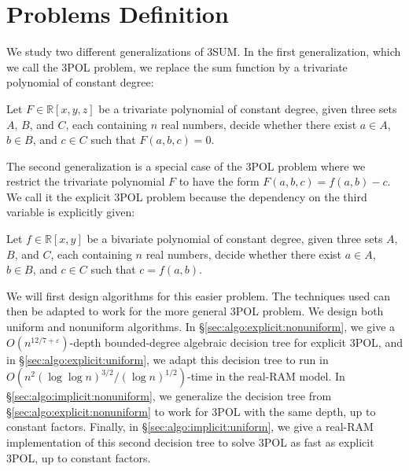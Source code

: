 \section{Problems Definition}

We study two different generalizations of 3SUM\@. In the first generalization,
which we call the 3POL problem, we replace the sum function by a trivariate
polynomial of constant degree:
\begin{problem}[3POL]
Let $F \in \mathbb{R}[x,y,z]$ be a trivariate polynomial of constant degree,
given three sets $A$, $B$, and $C$, each containing $n$ real numbers, decide
whether there exist $a \in A$, $b \in B$, and $c \in C$ such that
$F(a,b,c)=0$.
\end{problem}
The second generalization is a special case of the 3POL problem where we
restrict the trivariate polynomial $F$ to have the form $F(a,b,c) = f(a,b) -
c$. We call it the explicit 3POL problem because the dependency on the third
variable is explicitly given:
\begin{problem}
Let $f \in \mathbb{R}[x,y]$ be a bivariate polynomial of constant degree,
given three sets $A$, $B$, and $C$, each containing $n$ real numbers, decide
whether there exist $a \in A$, $b \in B$, and $c \in C$ such that $c=f(a,b)$.
\end{problem}
We will first design algorithms for this easier problem. The techniques used can
then be adapted to work for the more general 3POL problem. We design both
uniform and nonuniform algorithms.
%
In \S\ref{sec:algo:explicit:nonuniform},
we give a $O(n^{12/7+\varepsilon})$-depth bounded-degree
algebraic decision tree for explicit 3POL, and in
\S\ref{sec:algo:explicit:uniform}, we adapt this decision tree
to run in $O(n^2 {(\log \log n)}^{3/2} / {(\log n)}^{1/2})$-time
in the real-RAM model.
%
In \S\ref{sec:algo:implicit:nonuniform}, we generalize the decision tree from
\S\ref{sec:algo:explicit:nonuniform} to work for 3POL with the same depth, up
to constant factors.
%
Finally, in \S\ref{sec:algo:implicit:uniform}, we give a real-RAM
implementation of this second decision tree to solve 3POL as fast as
explicit 3POL, up to constant factors.
